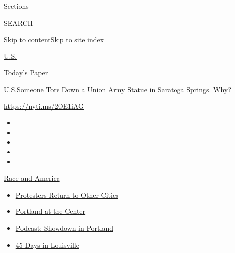 Sections

SEARCH

\protect\hyperlink{site-content}{Skip to
content}\protect\hyperlink{site-index}{Skip to site index}

\href{https://www.nytimes3xbfgragh.onion/section/us}{U.S.}

\href{https://myaccount.nytimes3xbfgragh.onion/auth/login?response_type=cookie\&client_id=vi}{}

\href{https://www.nytimes3xbfgragh.onion/section/todayspaper}{Today's
Paper}

\href{/section/us}{U.S.}\textbar{}Someone Tore Down a Union Army Statue
in Saratoga Springs. Why?

\url{https://nyti.ms/2OE1iAG}

\begin{itemize}
\item
\item
\item
\item
\item
\end{itemize}

\href{https://www.nytimes3xbfgragh.onion/news-event/george-floyd-protests-minneapolis-new-york-los-angeles?action=click\&pgtype=Article\&state=default\&region=TOP_BANNER\&context=storylines_menu}{Race
and America}

\begin{itemize}
\tightlist
\item
  \href{https://www.nytimes3xbfgragh.onion/2020/07/26/us/protests-portland-seattle-trump.html?action=click\&pgtype=Article\&state=default\&region=TOP_BANNER\&context=storylines_menu}{Protesters
  Return to Other Cities}
\item
  \href{https://www.nytimes3xbfgragh.onion/2020/07/24/us/portland-oregon-protests-white-race.html?action=click\&pgtype=Article\&state=default\&region=TOP_BANNER\&context=storylines_menu}{Portland
  at the Center}
\item
  \href{https://www.nytimes3xbfgragh.onion/2020/07/23/podcasts/the-daily/portland-protests.html?action=click\&pgtype=Article\&state=default\&region=TOP_BANNER\&context=storylines_menu}{Podcast:
  Showdown in Portland}
\item
  \href{https://www.nytimes3xbfgragh.onion/interactive/2020/07/16/us/black-lives-matter-protests-louisville-breonna-taylor.html?action=click\&pgtype=Article\&state=default\&region=TOP_BANNER\&context=storylines_menu}{45
  Days in Louisville}
\end{itemize}

